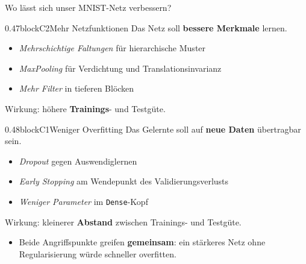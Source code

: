 \begin{frame}{Wo lässt sich unser MNIST-Netz verbessern?}
\small
\begin{blockrow}
\begin{blockcol}{0.47\linewidth}{blockC2}{\small Mehr Netzfunktionen}
Das Netz soll \textbf{bessere Merkmale} lernen.
\begin{itemize}
  \item \emph{Mehrschichtige Faltungen} für hierarchische Muster
  \item \emph{MaxPooling} für Verdichtung und Translationsinvarianz
  \item \emph{Mehr Filter} in tieferen Blöcken
\end{itemize}
Wirkung: höhere \textbf{Trainings}- und Testgüte.
\end{blockcol}
\begin{blockcol}{0.48\linewidth}{blockC1}{\small Weniger Overfitting}
Das Gelernte soll auf \textbf{neue Daten} übertragbar sein.
\begin{itemize}
  \item \emph{Dropout} gegen Auswendiglernen
  \item \emph{Early Stopping} am Wendepunkt des Validierungsverlusts
  \item \emph{Weniger Parameter} im \texttt{Dense}-Kopf
\end{itemize}
Wirkung: kleinerer \textbf{Abstand} zwischen Trainings- und Testgüte.
\end{blockcol}
\end{blockrow}
\medskip
\begin{itemize}
  \item Beide Angriffspunkte greifen \textbf{gemeinsam}: ein stärkeres Netz ohne Regularisierung würde schneller overfitten. 
\end{itemize}
\end{frame}




